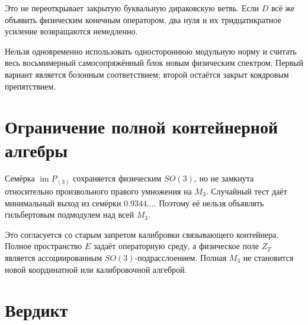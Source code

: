 Это не переоткрывает закрытую буквальную дираковскую ветвь. Если
$D$ всё же объявить физическим конечным оператором, два нуля и их
тридцатикратное усиление возвращаются немедленно.

\begin{nogocriterion}
Нельзя одновременно использовать одностороннюю модульную норму и считать
весь восьмимерный самосопряжённый блок новым физическим спектром. Первый
вариант является бозонным соответствием; второй остаётся закрыт
коядровым препятствием.
\end{nogocriterion}

\section{Ограничение полной контейнерной алгебры}

Семёрка $\operatorname{im}P_{(3)}$ сохраняется физическим $SO(3)$, но
не замкнута относительно произвольного правого умножения на $M_3$.
Случайный тест даёт минимальный выход из семёрки $0.9344\ldots$.
Поэтому её нельзя объявлять гильбертовым подмодулем над всей $M_3$.

Это согласуется со старым запретом калибровки связывающего контейнера.
Полное пространство $E$ задаёт операторную среду, а физическое поле
$Z_T$ является ассоциированным $SO(3)$-подрасслоением. Полная $M_3$ не
становится новой координатной или калибровочной алгеброй.

\section{Вердикт}

